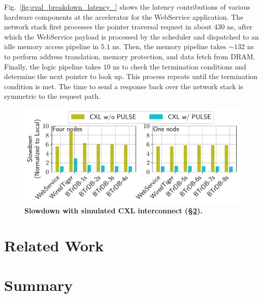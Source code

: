 Fig.~\ref{fig:eval_breakdown_latency_} shows the latency contributions of various hardware components at the \pulse accelerator for the WebService application. The network stack first processes the pointer traversal request in about $430$ ns, after which the WebService payload is processed by the scheduler and dispatched to an idle memory access pipeline in $5.1$ ns. Then, the memory pipeline takes $\sim$$132$ ns to perform address translation, memory protection, and data fetch from DRAM. Finally, the logic pipeline takes $10$ ns to check the termination conditions and determine the next pointer to look up. This process repeats until the termination condition is met. The time to send a response back over the network stack is symmetric to the request path.












\begin{figure}[t]
\centering
\includegraphics[width=0.9\columnwidth]{fig/pulse/cxl.pdf}
\vspace{-1em}
\caption[Slowdown with simulated CXL interconnect]{\textbf{Slowdown with simulated CXL interconnect (\S\ref{sec:future}).} }

\label{fig:eval_cxl}
\end{figure}


\section{Related Work}

\section{Summary}
\label{sec:future}


